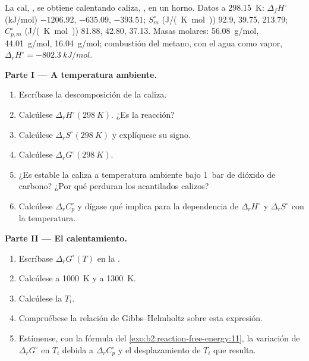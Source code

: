 \begin{problem}
\label{pb:b2:reaction-free-energy:1}
La cal, , se obtiene calentando caliza, , en un horno. Datos a
\qty{298.15}{K}: $\Delta_f H^\circ$ (\unit{kJ/mol}) 
$-1206.92$,  $-635.09$,  $-393.51$; $S^\circ_m$
(\unit{J/(K.mol)}) 92.9, 39.75, 213.79; $C^\circ_{p,m}$ (\unit{J/(K.mol)})
81.88, 42.80, 37.13. Masas molares:  \qty{56.08}{g/mol}, 
\qty{44.01}{g/mol},  \qty{16.04}{g/mol}; combustión del metano,
con el agua como vapor, $\Delta_r H^\circ = \qty{-802.3}{kJ/mol}$.

\medskip
\noindent\textbf{Parte I --- A temperatura ambiente.}
\begin{enumerate}
  \item Escríbase la descomposición de la caliza.
  \item Calcúlese $\Delta_r H^\circ(\qty{298}{K})$. ¿Es  la reacción?
  \item Calcúlese $\Delta_r S^\circ(\qty{298}{K})$ y explíquese su signo.
  \item Calcúlese $\Delta_r G^\circ(\qty{298}{K})$.
  \item ¿Es estable la caliza a temperatura ambiente bajo \qty{1}{bar} de
        dióxido de carbono? ¿Por qué perduran los acantilados calizos?
  \item Calcúlese $\Delta_r C^\circ_p$ y dígase qué implica para la
        dependencia de $\Delta_r H^\circ$ y $\Delta_r S^\circ$ con la temperatura.
\end{enumerate}

\medskip
\noindent\textbf{Parte II --- El calentamiento.}
\begin{enumerate}[resume]
  \item Escríbase $\Delta_r G^\circ(T)$ en la .
  \item Calcúlese a \qty{1000}{K} y a \qty{1300}{K}.
  \item Calcúlese la  $T_i$.
  \item Compruébese la relación de Gibbs--Helmholtz sobre esta expresión.
  \item Estímense, con la fórmula del \cref{exo:b2:reaction-free-energy:11},
        la variación de $\Delta_r G^\circ$ en $T_i$ debida a
        $\Delta_r C^\circ_p$ y el desplazamiento de $T_i$ que resulta.
\end{enumerate}


\end{problem}
